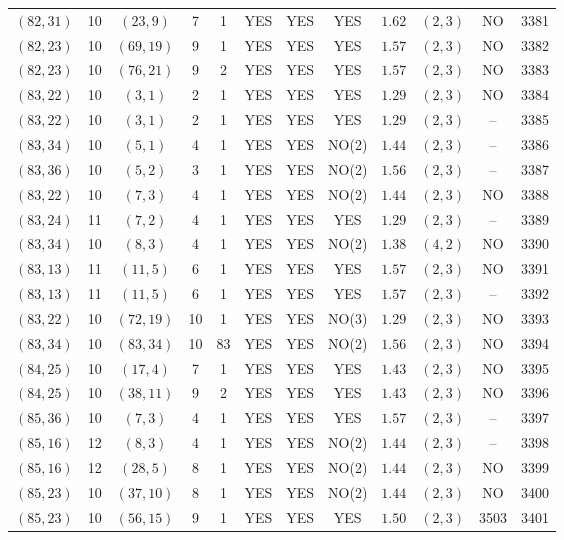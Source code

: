 \begin{longtable}{|c|c|c|c|c|c|c|c|c|c|c|c|}
$(82,31)$ & 10 & $(23,9)$ & 7 & 1 & YES & YES & YES & $1.62$ & $(2,3)$ & NO & 3381\\
$(82,23)$ & 10 & $(69,19)$ & 9 & 1 & YES & YES & YES & $1.57$ & $(2,3)$ & NO & 3382\\
$(82,23)$ & 10 & $(76,21)$ & 9 & 2 & YES & YES & YES & $1.57$ & $(2,3)$ & NO & 3383\\
$(83,22)$ & 10 & $(3,1)$ & 2 & 1 & YES & YES & YES & $1.29$ & $(2,3)$ & NO & 3384\\
$(83,22)$ & 10 & $(3,1)$ & 2 & 1 & YES & YES & YES & $1.29$ & $(2,3)$ & -- & 3385\\
$(83,34)$ & 10 & $(5,1)$ & 4 & 1 & YES & YES & NO(2) & $1.44$ & $(2,3)$ & -- & 3386\\
$(83,36)$ & 10 & $(5,2)$ & 3 & 1 & YES & YES & NO(2) & $1.56$ & $(2,3)$ & -- & 3387\\
$(83,22)$ & 10 & $(7,3)$ & 4 & 1 & YES & YES & NO(2) & $1.44$ & $(2,3)$ & NO & 3388\\
$(83,24)$ & 11 & $(7,2)$ & 4 & 1 & YES & YES & YES & $1.29$ & $(2,3)$ & -- & 3389\\
$(83,34)$ & 10 & $(8,3)$ & 4 & 1 & YES & YES & NO(2) & $1.38$ & $(4,2)$ & NO & 3390\\
$(83,13)$ & 11 & $(11,5)$ & 6 & 1 & YES & YES & YES & $1.57$ & $(2,3)$ & NO & 3391\\
$(83,13)$ & 11 & $(11,5)$ & 6 & 1 & YES & YES & YES & $1.57$ & $(2,3)$ & -- & 3392\\
$(83,22)$ & 10 & $(72,19)$ & 10 & 1 & YES & YES & NO(3) & $1.29$ & $(2,3)$ & NO & 3393\\
$(83,34)$ & 10 & $(83,34)$ & 10 & 83 & YES & YES & NO(2) & $1.56$ & $(2,3)$ & NO & 3394\\
$(84,25)$ & 10 & $(17,4)$ & 7 & 1 & YES & YES & YES & $1.43$ & $(2,3)$ & NO & 3395\\
$(84,25)$ & 10 & $(38,11)$ & 9 & 2 & YES & YES & YES & $1.43$ & $(2,3)$ & NO & 3396\\
$(85,36)$ & 10 & $(7,3)$ & 4 & 1 & YES & YES & YES & $1.57$ & $(2,3)$ & -- & 3397\\
$(85,16)$ & 12 & $(8,3)$ & 4 & 1 & YES & YES & NO(2) & $1.44$ & $(2,3)$ & -- & 3398\\
$(85,16)$ & 12 & $(28,5)$ & 8 & 1 & YES & YES & NO(2) & $1.44$ & $(2,3)$ & NO & 3399\\
$(85,23)$ & 10 & $(37,10)$ & 8 & 1 & YES & YES & NO(2) & $1.44$ & $(2,3)$ & NO & 3400\\
$(85,23)$ & 10 & $(56,15)$ & 9 & 1 & YES & YES & YES & $1.50$ & $(2,3)$ & 3503 & 3401\\

\end{longtable}
